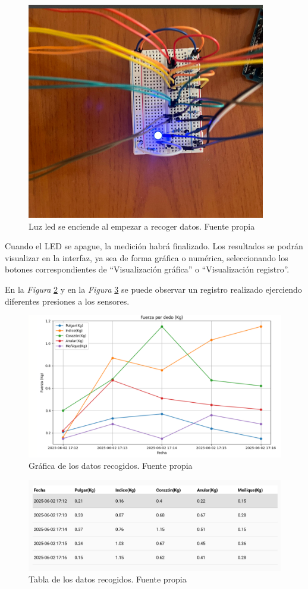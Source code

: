 \begin{figure}
    \centering
    \includegraphics[angle=90 ,width=0.5\linewidth]{img/Luz_encendido.png}
    \caption{Luz led se enciende al empezar a recoger datos. Fuente propia}
    \label{fig:luz}
\end{figure}

Cuando el LED se apague, la medición habrá finalizado. Los resultados se podrán visualizar en la interfaz, ya sea de forma gráfica o numérica, seleccionando los botones correspondientes de “Visualización gráfica” o “Visualización registro”.

En la \textit{Figura} \ref{fig:Grafico} y en la \textit{Figura} \ref{fig:registro} se puede observar un registro realizado ejerciendo diferentes presiones a los sensores. 
\begin{figure}
    \centering
    \includegraphics[width=1\linewidth]{img/grafica_fuerza.png}
    \caption{Gráfica de los datos recogidos. Fuente propia}
    \label{fig:Grafico}
\end{figure}

\begin{figure}
    \centering
    \includegraphics[width=1\linewidth]{img/Datos_medidas.png}
    \caption{Tabla de los datos recogidos. Fuente propia}
    \label{fig:registro}
\end{figure}